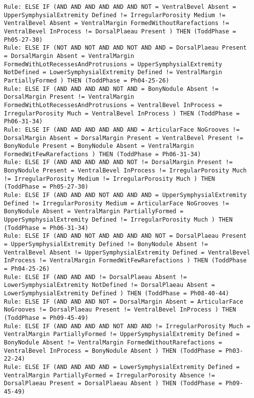 \begin{lstlisting}
Rule: ELSE IF (AND AND AND AND AND AND NOT = VentralBevel Absent = UpperSymphysialExtremity Defined != IrregularPorosity Medium != VentralBevel Absent = VentralMargin FormedWithoutRarefactions != VentralBevel InProcess != DorsalPlaeau Present ) THEN (ToddPhase = Ph05-27-30)
Rule: ELSE IF (NOT AND NOT AND AND NOT AND AND = DorsalPlaeau Present = DorsalMargin Absent = VentralMargin FormedWithLotRecessesAndProtrusions = UpperSymphysialExtremity NotDefined = LowerSymphysialExtremity Defined != VentralMargin PartiallyFormed ) THEN (ToddPhase = Ph04-25-26)
Rule: ELSE IF (AND AND AND AND NOT AND = BonyNodule Absent != DorsalMargin Present != VentralMargin FormedWithLotRecessesAndProtrusions = VentralBevel InProcess = IrregularPorosity Much = VentralBevel InProcess ) THEN (ToddPhase = Ph06-31-34)
Rule: ELSE IF (AND AND AND AND AND AND = ArticularFace NoGrooves != DorsalMargin Absent = DorsalMargin Present = VentralBevel Present != BonyNodule Present = BonyNodule Absent = VentralMargin FormedWitFewRarefactions ) THEN (ToddPhase = Ph06-31-34)
Rule: ELSE IF (AND AND AND AND AND NOT != DorsalMargin Present != BonyNodule Present = VentralBevel InProcess != IrregularPorosity Much != IrregularPorosity Medium != IrregularPorosity Much ) THEN (ToddPhase = Ph05-27-30)
Rule: ELSE IF (AND AND AND NOT AND AND AND = UpperSymphysialExtremity Defined != IrregularPorosity Medium = ArticularFace NoGrooves != BonyNodule Absent = VentralMargin PartiallyFormed = UpperSymphysialExtremity Defined != IrregularPorosity Much ) THEN (ToddPhase = Ph06-31-34)
Rule: ELSE IF (AND AND NOT AND AND AND AND NOT = DorsalPlaeau Present = UpperSymphysialExtremity Defined != BonyNodule Absent != VentralBevel Absent != UpperSymphysialExtremity Defined = VentralBevel InProcess != VentralMargin FormedWitFewRarefactions ) THEN (ToddPhase = Ph04-25-26)
Rule: ELSE IF (AND AND AND != DorsalPlaeau Absent != LowerSymphysialExtremity NotDefined != DorsalPlaeau Absent = LowerSymphysialExtremity Defined ) THEN (ToddPhase = Ph08-40-44)
Rule: ELSE IF (AND AND AND NOT = DorsalMargin Absent = ArticularFace NoGrooves != DorsalPlaeau Present != VentralBevel InProcess ) THEN (ToddPhase = Ph09-45-49)
Rule: ELSE IF (AND AND AND AND NOT AND AND != IrregularPorosity Much = VentralMargin PartiallyFormed != UpperSymphysialExtremity Defined = BonyNodule Absent != VentralMargin FormedWithoutRarefactions = VentralBevel InProcess = BonyNodule Absent ) THEN (ToddPhase = Ph03-22-24)
Rule: ELSE IF (AND AND AND AND = LowerSymphysialExtremity Defined = VentralMargin PartiallyFormed = IrregularPorosity Absence != DorsalPlaeau Present = DorsalPlaeau Absent ) THEN (ToddPhase = Ph09-45-49)

\end{lstlisting}
